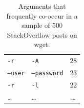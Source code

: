 \begin{table}
\caption{Arguments that frequently co-occur in a sample of 500 StackOverflow posts on wget.}
\label{tab:wget_arguments}
\centering
\begin{tabular}{llc}
\toprule
\headrow{Option 1} & \headrow{Option 2} & \headrow{Count} \\
\midrule
\texttt{-r} & \texttt{-A} & 28 \\ \midrule
\texttt{--user} & \texttt{--password} & 23 \\ \midrule
\texttt{-r} & \texttt{-l} & 22 \\ \midrule
\dots & \dots & \dots \\ \bottomrule
\end{tabular}
\end{table}

